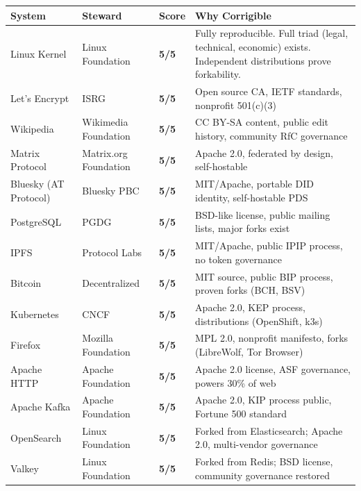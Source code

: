 \documentclass{article}
\begin{document}
\begin{table}[htbp]
\centering
\small
\renewcommand{\arraystretch}{1.3}
\begin{tabular}{@{}l>{\raggedright}p{3.2cm}>{\centering\arraybackslash}p{1.2cm}p{5.8cm}@{}}
\toprule
\rowcolor{gray!15}
\textbf{System} & \textbf{Steward} & \textbf{Score} & \textbf{Why Corrigible} \\
\midrule
\rowcolor{green!8}
Linux Kernel & Linux Foundation & \textbf{5/5} & Fully reproducible. Full triad (legal, technical, economic) exists. Independent distributions prove forkability. \\
Let's Encrypt & ISRG & \textbf{5/5} & Open source CA, IETF standards, nonprofit 501(c)(3) \\
\rowcolor{green!8}
Wikipedia & Wikimedia Foundation & \textbf{5/5} & CC BY-SA content, public edit history, community RfC governance \\
Matrix Protocol & Matrix.org Foundation & \textbf{5/5} & Apache 2.0, federated by design, self-hostable \\
\rowcolor{green!8}
Bluesky (AT Protocol) & Bluesky PBC & \textbf{5/5} & MIT/Apache, portable DID identity, self-hostable PDS \\
PostgreSQL & PGDG & \textbf{5/5} & BSD-like license, public mailing lists, major forks exist \\
\rowcolor{green!8}
IPFS & Protocol Labs & \textbf{5/5} & MIT/Apache, public IPIP process, no token governance \\
Bitcoin & Decentralized & \textbf{5/5} & MIT source, public BIP process, proven forks (BCH, BSV) \\
\rowcolor{green!8}
Kubernetes & CNCF & \textbf{5/5} & Apache 2.0, KEP process, distributions (OpenShift, k3s) \\
Firefox & Mozilla Foundation & \textbf{5/5} & MPL 2.0, nonprofit manifesto, forks (LibreWolf, Tor Browser) \\
\rowcolor{green!8}
Apache HTTP & Apache Foundation & \textbf{5/5} & Apache 2.0 license, ASF governance, powers 30\% of web \\
Apache Kafka & Apache Foundation & \textbf{5/5} & Apache 2.0, KIP process public, Fortune 500 standard \\
\rowcolor{green!8}
OpenSearch & Linux Foundation & \textbf{5/5} & Forked from Elasticsearch; Apache 2.0, multi-vendor governance \\
Valkey & Linux Foundation & \textbf{5/5} & Forked from Redis; BSD license, community governance restored \\

\end{tabular}
\end{table}
\end{document}
